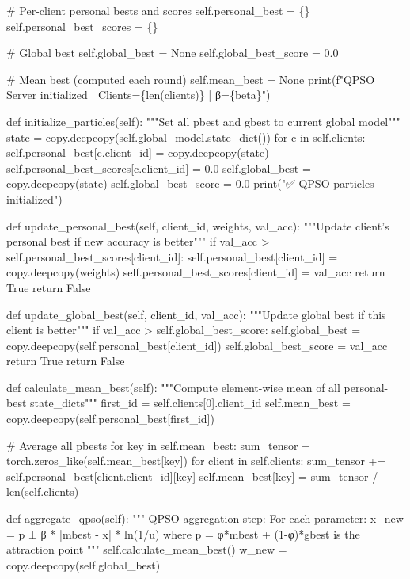         \# Per-client personal bests and scores
        self.personal\_best = \{\}
        self.personal\_best\_scores = \{\}
        
        \# Global best
        self.global\_best = None
        self.global\_best\_score = 0.0
        
        \# Mean best (computed each round)
        self.mean\_best = None
        print(f"QPSO Server initialized | Clients=\{len(clients)\} | β=\{beta\}")
    
    def initialize\_particles(self):
        """Set all pbest and gbest to current global model"""
        state = copy.deepcopy(self.global\_model.state\_dict())
        for c in self.clients:
            self.personal\_best[c.client\_id] = copy.deepcopy(state)
            self.personal\_best\_scores[c.client\_id] = 0.0
        self.global\_best = copy.deepcopy(state)
        self.global\_best\_score = 0.0
        print("✅ QPSO particles initialized")
    
    def update\_personal\_best(self, client\_id, weights, val\_acc):
        """Update client's personal best if new accuracy is better"""
        if val\_acc > self.personal\_best\_scores[client\_id]:
            self.personal\_best[client\_id] = copy.deepcopy(weights)
            self.personal\_best\_scores[client\_id] = val\_acc
            return True
        return False
    
    def update\_global\_best(self, client\_id, val\_acc):
        """Update global best if this client is better"""
        if val\_acc > self.global\_best\_score:
            self.global\_best = copy.deepcopy(self.personal\_best[client\_id])
            self.global\_best\_score = val\_acc
            return True
        return False
    
    def calculate\_mean\_best(self):
        """Compute element-wise mean of all personal-best state\_dicts"""
        first\_id = self.clients[0].client\_id
        self.mean\_best = copy.deepcopy(self.personal\_best[first\_id])
        
        \# Average all pbests
        for key in self.mean\_best:
            sum\_tensor = torch.zeros\_like(self.mean\_best[key])
            for client in self.clients:
                sum\_tensor += self.personal\_best[client.client\_id][key]
            self.mean\_best[key] = sum\_tensor / len(self.clients)
    
    def aggregate\_qpso(self):
        """
        QPSO aggregation step:
        For each parameter: x\_new = p ± β * |mbest - x| * ln(1/u)
        where p = φ*mbest + (1-φ)*gbest is the attraction point
        """
        self.calculate\_mean\_best()
        w\_new = copy.deepcopy(self.global\_best)
        
